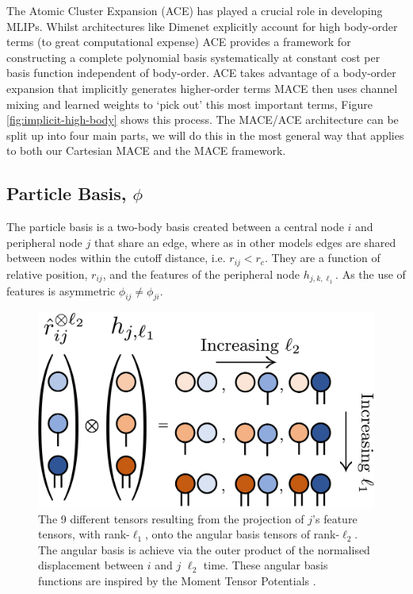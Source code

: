 The Atomic Cluster Expansion (ACE) \cite{drautz2019atomic} has played a crucial role in developing MLIPs. Whilst architectures like Dimenet explicitly account for high body-order terms (to great computational expense) ACE provides a framework for constructing a complete polynomial basis systematically at constant cost per basis function independent of body-order\cite{dusson2022atomic}. ACE takes advantage of a body-order expansion that implicitly generates higher-order terms MACE then uses channel mixing and learned weights to `pick out' this most important terms, Figure \ref{fig:implicit-high-body} shows this process. The MACE/ACE architecture can be split up into four main parts, we will do this in the most general way that applies to both our Cartesian MACE and the MACE framework.

\subsection{Particle Basis, $\phi$}

The particle basis is a two-body basis created between a central node $i$ and peripheral node $j$ that share an edge, where as in other models edges are shared between nodes within the cutoff distance, i.e. $r_{ij} < r_c$. They are a function of relative position, $r_{ij}$, and the features of the peripheral node $h_{j,k,\ell_1}$. As the use of features is asymmetric $\phi_{ij} \neq \phi_{ji}$.

\begin{figure}[H]
    \centering
    \includegraphics[scale=0.3]{figures/projection.png}
    \caption{The 9 different tensors resulting from the projection of $j$'s feature tensors, with rank-$\ell_1$, onto the angular basis tensors of rank-$\ell_2$. The angular basis is achieve via the outer product of the normalised displacement between $i$ and $j$ $\ell_2$ time. These angular basis functions are inspired by the Moment Tensor Potentials \cite{shapeev2016moment}.}
    \label{fig:projection}
\end{figure}

